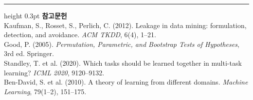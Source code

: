\documentclass[10pt]{article}
\begin{document}
\vspace{0.6em}
\hrule height 0.3pt
\vspace{0.5em}
{\footnotesize
\textbf{참고문헌}\\[0.3em]
Kaufman, S., Rosset, S., Perlich, C. (2012). Leakage in data mining: formulation,
detection, and avoidance. \emph{ACM TKDD}, 6(4), 1--21.\\[0.15em]
Good, P. (2005). \emph{Permutation, Parametric, and Bootstrap Tests of Hypotheses},
3rd ed. Springer.\\[0.15em]
Standley, T. et al. (2020). Which tasks should be learned together in multi-task
learning? \emph{ICML 2020}, 9120--9132.\\[0.15em]
Ben-David, S. et al. (2010). A theory of learning from different domains.
\emph{Machine Learning}, 79(1--2), 151--175.
}
\end{document}
